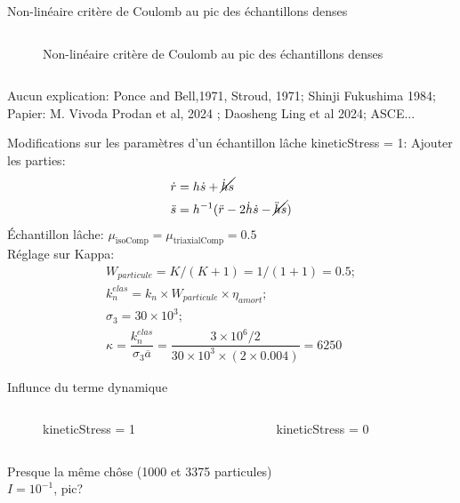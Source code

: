 \documentclass[10pt]{beamer}
\begin{document}
\begin{frame}{Non-linéaire critère de Coulomb au pic des échantillons denses}
\begin{columns}
\begin{column}{0.5\textwidth}
\begin{figure}[h]
                \caption{Non-linéaire critère de Coulomb au pic des échantillons denses}
            \end{figure}
        \end{column}
    \end{columns}
                Aucun explication: Ponce and Bell,1971, Stroud, 1971; Shinji Fukushima 1984;
Papier: M. Vivoda Prodan et al, 2024 ;
Daosheng Ling et al 2024;
ASCE...
\end{frame}


\begin{frame}{Modifications sur les paramètres d'un échantillon lâche}
    kineticStress = 1: Ajouter les parties:
    \begin{align*}
    \dot{r} &= h\dot{s} + \cancel{\dot{h}s} \\
    \ddot{s} &= h^{-1}(\ddot{r} - 2\dot{h}\dot{s} - \cancel{\ddot{h}s})
    \end{align*}
    Échantillon lâche: $ \mu_{\text{isoComp}} = \mu_{\text{triaxialComp}} = 0.5$ \\
    Réglage sur Kappa:
    \begin{align*}
            W_{particule} = K / (K + 1) = 1 / (1 + 1) = 0.5; \\
            k_n^{elas} = k_n \times W_{particule} \times \eta_{amort}; \\
            \sigma_3 = 30 \times 10^3; \\
    \kappa = \dfrac{k_n^{elas}}{\sigma_3 \overline{a}} = \dfrac{3\times10^{6}/2}{30\times10^{3} \times (2 \times 0.004)} = 6250
\end{align*}

\end{frame}



\begin{frame}{Influnce du terme dynamique}
    \begin{columns}
        \begin{column}{0.5\textwidth}
            \begin{figure}
                \centering
                \scalebox{0.5}{}
                \caption{kineticStress = 1}
            \end{figure}
        \end{column}
        \begin{column}{0.5\textwidth}
            \begin{figure}
                \centering
                \scalebox{0.5}{}
                \caption{kineticStress = 0}
            \end{figure}
        \end{column}
    \end{columns}
    Presque la même chôse (1000 et 3375 particules)\\
    $I = 10^{-1}$, pic?
\end{frame}
\end{document}
